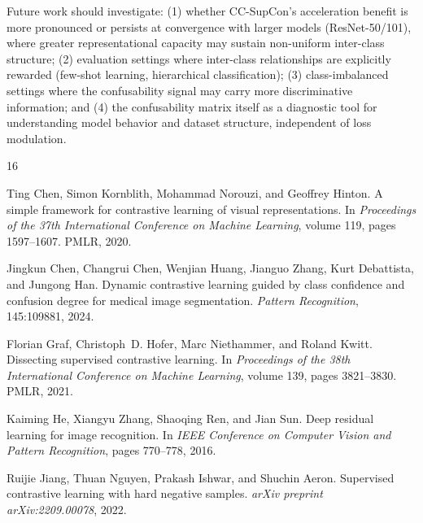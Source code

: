 \documentclass{article}
\begin{document}
Future work should investigate: (1) whether CC-SupCon's acceleration benefit is more pronounced or persists at convergence with larger models (ResNet-50/101), where greater representational capacity may sustain non-uniform inter-class structure; (2) evaluation settings where inter-class relationships are explicitly rewarded (few-shot learning, hierarchical classification); (3) class-imbalanced settings where the confusability signal may carry more discriminative information; and (4) the confusability matrix itself as a diagnostic tool for understanding model behavior and dataset structure, independent of loss modulation.



\begin{thebibliography}{16}

Ting Chen, Simon Kornblith, Mohammad Norouzi, and Geoffrey Hinton.
\newblock A simple framework for contrastive learning of visual representations.
\newblock In \emph{Proceedings of the 37th International Conference on Machine Learning}, volume 119, pages 1597--1607. PMLR, 2020.

Jingkun Chen, Changrui Chen, Wenjian Huang, Jianguo Zhang, Kurt Debattista, and Jungong Han.
\newblock Dynamic contrastive learning guided by class confidence and confusion degree for medical image segmentation.
\newblock \emph{Pattern Recognition}, 145:109881, 2024.

Florian Graf, Christoph~D. Hofer, Marc Niethammer, and Roland Kwitt.
\newblock Dissecting supervised contrastive learning.
\newblock In \emph{Proceedings of the 38th International Conference on Machine Learning}, volume 139, pages 3821--3830. PMLR, 2021.

Kaiming He, Xiangyu Zhang, Shaoqing Ren, and Jian Sun.
\newblock Deep residual learning for image recognition.
\newblock In \emph{IEEE Conference on Computer Vision and Pattern Recognition}, pages 770--778, 2016.

Ruijie Jiang, Thuan Nguyen, Prakash Ishwar, and Shuchin Aeron.
\newblock Supervised contrastive learning with hard negative samples.
\newblock \emph{arXiv preprint arXiv:2209.00078}, 2022.


\end{thebibliography}
\end{document}
